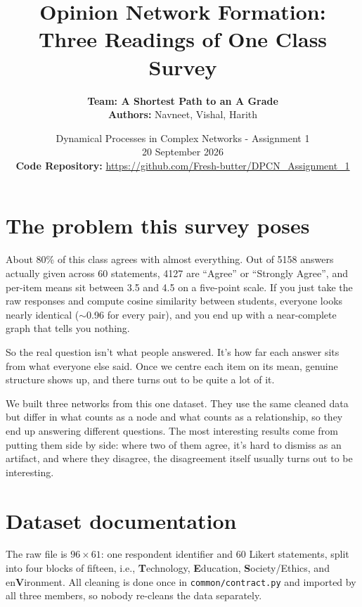 \documentclass[10pt,a4paper]{article}
\title{\vspace{-1.5cm}\textbf{Opinion Network Formation:\\Three Readings of One Class Survey}}
\author{\Large \textbf{Team: A Shortest Path to an A Grade} \\[0.2em]
\large \textbf{Authors:} Navneet, Vishal, Harith}
\date{Dynamical Processes in Complex Networks - Assignment 1\\[0.2em]
20 September 2026\\[0.5em]
\small \textbf{Code Repository:} \url{https://github.com/Fresh-butter/DPCN_Assignment_1}}
\begin{document}
\maketitle
\vspace{-1.5em}

\section*{The problem this survey poses}

About 80\% of this class agrees with almost everything. Out of 5158 answers actually
given across 60 statements, 4127 are ``Agree'' or ``Strongly Agree'', and per-item
means sit between 3.5 and 4.5 on a five-point scale. If you just take the raw responses
and compute cosine similarity between students, everyone looks nearly identical
($\sim$0.96 for every pair), and you end up with a near-complete graph that tells you
nothing.

So the real question isn't what people answered. It's how far each answer sits
from what everyone else said. Once we centre each item on its mean, genuine structure
shows up, and there turns out to be quite a lot of it.

We built three networks from this one dataset. They use the same cleaned data but
differ in what counts as a node and what counts as a relationship, so they end up
answering different questions. The most interesting results come from putting them
side by side: where two of them agree, it's hard to dismiss as an artifact, and where
they disagree, the disagreement itself usually turns out to be interesting.

\section{Dataset documentation}

The raw file is $96 \times 61$: one respondent identifier and 60 Likert statements,
split into four blocks of fifteen, i.e., \textbf{T}echnology, \textbf{E}ducation,
\textbf{S}ociety/Ethics, and en\textbf{V}ironment. All cleaning is done once in
\texttt{common/contract.py} and imported by all three members, so nobody re-cleans
the data separately.
\end{document}

